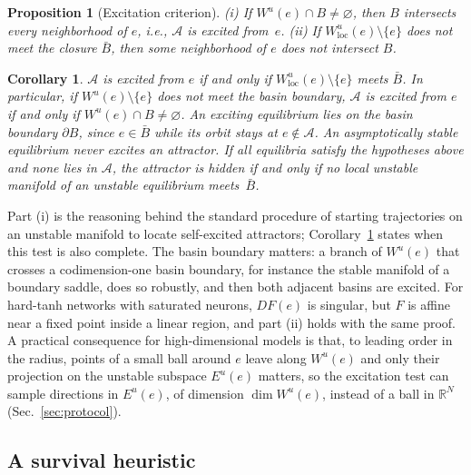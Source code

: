 \documentclass[aip,cha,reprint,amsmath,amssymb,longbibliography]{revtex4-2}
\newtheorem{proposition}{Proposition}
\newtheorem{corollary}{Corollary}
\theoremstyle{definition}
\begin{document}
\begin{proposition}[Excitation criterion]
\label{prop:manifold}
(i) If $W^u(e)\cap B\neq\varnothing$, then $B$ intersects every neighborhood of $e$, i.e., $\mathcal{A}$ is excited
from~$e$. (ii) If $W^u_{\mathrm{loc}}(e)\setminus\{e\}$ does not meet the closure $\bar B$, then some neighborhood of $e$
does not intersect $B$.
\end{proposition}

\begin{corollary}
\label{cor:criterion}
$\mathcal{A}$ is excited from $e$ if and only if $W^u_{\mathrm{loc}}(e)\setminus\{e\}$ meets $\bar B$. In particular, if
$W^u(e)\setminus\{e\}$ does not meet the basin boundary, $\mathcal{A}$ is excited from $e$ if and only if
$W^u(e)\cap B\neq\varnothing$. An exciting equilibrium lies on the basin boundary $\partial B$, since $e\in\bar B$ while its
orbit stays at $e\notin\mathcal{A}$. An asymptotically stable equilibrium never excites an attractor. If all equilibria satisfy the hypotheses above and none lies
in $\mathcal{A}$, the attractor is hidden if and only if no local unstable manifold of an unstable equilibrium
meets~$\bar B$.
\end{corollary}

Part (i) is the reasoning behind the standard procedure of starting trajectories on an unstable manifold to locate
self-excited attractors;\cite{LeonovKuznetsov2013,Dudkowski2016} Corollary~\ref{cor:criterion} states when this test is also
complete. The basin boundary matters: a branch of $W^u(e)$ that crosses a codimension-one basin boundary, for instance the
stable manifold of a boundary saddle, does so robustly, and then both adjacent basins are excited. For hard-tanh networks
with saturated neurons, $DF(e)$ is singular, but $F$ is affine near a fixed point inside a linear region, and
part (ii) holds with the same proof. A practical consequence for high-dimensional models is that, to leading order in the
radius, points of a small ball around $e$ leave along $W^u(e)$ and only their projection on the unstable subspace
$E^u(e)$ matters, so the excitation test can sample directions in $E^u(e)$, of dimension $\dim W^u(e)$, instead of a ball
in $\mathbb{R}^N$ (Sec.~\ref{sec:protocol}).

\subsection{A survival heuristic}
\label{sec:heuristic}
\end{document}
